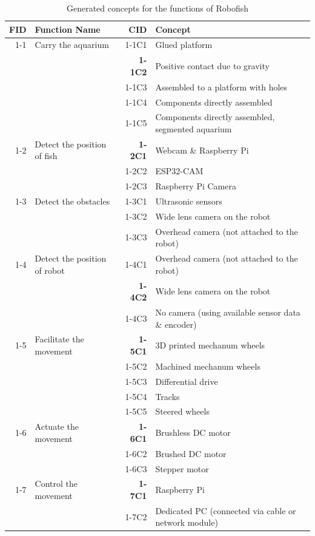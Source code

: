\documentclass[a4paper, 10pt, DIV=16, parskip = full, twocolumn = true]{scrartcl}
\begin{document}

\begin{table}
\centering
\caption{Generated concepts for the functions of Robofish}
	\begin{tabular}{rlrl}
	\toprule
		FID & Function Name & CID & Concept \\
	\midrule
		1-1 & Carry the aquarium & 1-1C1 & Glued platform \\	
	 	& & \textbf{1-1C2} & Positive contact due to gravity \\	
		& & 1-1C3 & Assembled to a platform with holes \\	
		& & 1-1C4 & Components directly assembled \\	
		& & 1-1C5 & Components directly assembled, segmented aquarium \\	
		1-2 & Detect the position of fish & \textbf{1-2C1} & Webcam \& Raspberry Pi \\
		& & 1-2C2 & ESP32-CAM \\	
		& & 1-2C3 & Raspberry Pi Camera \\	
		1-3 & Detect the obstacles & 1-3C1 & Ultrasonic sensors \\
		& & 1-3C2 & Wide lens camera on the robot \\	
		& & 1-3C3 & Overhead camera (not attached to the robot) \\
		1-4 & Detect the position of robot & 1-4C1 & Overhead camera (not attached to the robot) \\	 
		& & \textbf{1-4C2} & Wide lens camera on the robot \\
		& & 1-4C3 & No camera (using available sensor data \& encoder) \\
		1-5 & Facilitate the movement & \textbf{1-5C1} & 3D printed mechanum wheels \\
		& & 1-5C2 & Machined mechanum wheels \\	
		& & 1-5C3 & Differential drive \\
		& & 1-5C4 & Tracks \\	
		& & 1-5C5 & Steered wheels \\
		1-6 & Actuate the movement & \textbf{1-6C1} & Brushless DC motor \\
		& & 1-6C2 & Brushed DC motor \\	
		& & 1-6C3 & Stepper motor \\
		1-7 & Control the movement & \textbf{1-7C1} & Raspberry Pi \\
		& & 1-7C2 & Dedicated PC (connected via cable or network module) \\	

\end{tabular}
\end{table}
\end{document}
